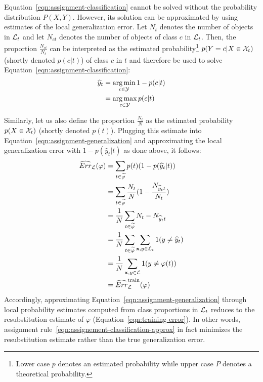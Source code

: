Equation~\ref{eqn:assignment-classification} cannot be solved without the
probability distribution $P(X, Y)$. However, its solution can be approximated
by using estimates of the local generalization error. Let $N_t$ denotes the
number of objects in ${\cal L}_t$ and let $N_{ct}$ denotes the number of
objects of class $c$ in ${\cal L}_t$. Then, the proportion
$\tfrac{N_{ct}}{N_t}$ can be interpreted as the estimated
probability\footnote{Lower case $p$ denotes an estimated probability while
upper case $P$ denotes a theoretical probability.} $p(Y=c|X\in{\cal X}_t)$
(shortly denoted $p(c|t)$) of class $c$ in $t$ and therefore be used to solve
Equation~\ref{eqn:assignment-classification}:
\begin{align}\label{eqn:assignement-classification-approx}
\widehat{y}_t &= \operatorname*{arg\,min}_{c \in {\cal Y}} 1 - p(c | t) \nonumber \\
              &= \operatorname*{arg\,max}_{c \in {\cal Y}} p(c | t)
\end{align}

Similarly, let us also define the proportion $\tfrac{N_t}{N}$ as the estimated
probability $p(X \in {\cal X}_t)$ (shortly denoted $p(t)$). Plugging this
estimate into Equation~\ref{eqn:assignment-generalization} and approximating
the local generalization error with $1 - p(\widehat{y}_t | t)$ as done above, it follows:
\begin{align}
\widehat{Err}_{\cal L}(\varphi) &= \sum_{t \in \widetilde{\varphi}} p(t) (1 - p(\widehat{y}_t | t)) \nonumber \\
    &= \sum_{t \in \widetilde{\varphi}} \frac{N_t}{N} (1 - \frac{N_{{\widehat{y}_t}t}}{N_t}) \nonumber \\
    &= \frac{1}{N} \sum_{t \in \widetilde{\varphi}} N_t - N_{{\widehat{y}_t}t} \nonumber \\
    &= \frac{1}{N} \sum_{t \in \widetilde{\varphi}} \sum_{\mathbf{x}, y \in {\cal L}_t} 1(y \neq \widehat{y}_t) \nonumber \\
    &= \frac{1}{N} \sum_{\mathbf{x}, y \in {\cal L}} 1(y \neq \varphi(t)) \nonumber \\
    &= \widehat{Err}_{\cal L}^\text{train}(\varphi) \label{eqn:train-error-tree}
\end{align}
Accordingly, approximating Equation~\ref{eqn:assignment-generalization}
through local probability estimates computed from class proportions in
${\cal L}_t$ reduces to the resubstitution estimate of $\varphi$
(Equation~\ref{eqn:training-error}). In other words, assignment
rule~\ref{eqn:assignement-classification-approx} in fact minimizes the
resubstitution estimate rather than the true
generalization error.

